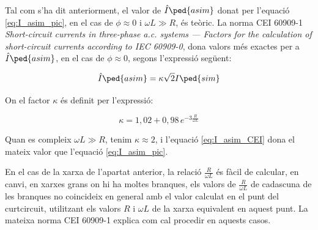 Tal com s'ha dit anteriorment, el valor de $\hat{I}\ped{asim}$ donat per l'equació \eqref{eq:I_asim_pic}, en el cas de $\phi \approx 0$ i $\omega L\gg R$, és teòric. La norma CEI 60909-1 \textit{Short-circuit currents in three-phase a.c. systems ---  Factors for the calculation of short-circuit currents according to IEC 60909-0}, dona valors més exactes per a $\hat{I}\ped{asim}$, en el cas de $\phi \approx 0$, segons l'expressió següent:

\begin{equation}
    \hat{I}\ped{asim} = \kappa \sqrt{2} I\ped{sim} \label{eq:I_asim_CEI}
\end{equation}

On el factor $\kappa$ és definit per l'expressió:

\begin{equation}
    \kappa = 1{,}02 + 0{,}98 \,e^{-3\frac{R}{\omega L}}\label{eq:kappa_CEI}
\end{equation}

Quan es compleix $\omega L\gg R$, tenim $\kappa \approx 2$, i l'equació \eqref{eq:I_asim_CEI} dona el mateix valor que l'equació \eqref{eq:I_asim_pic}.

En el cas de la xarxa de l'apartat anterior, la relació $\frac{R}{\omega L}$ és fàcil de  calcular, en canvi, en xarxes grans on hi ha moltes branques, els valors de $\frac{R}{\omega L}$ de cadascuna de les branques no coincideix en general amb el valor calculat en el punt del curtcircuit, utilitzant els valors $R$ i $\omega L$ de la xarxa equivalent en aquest punt. La mateixa norma CEI 60909-1 explica com cal procedir en aquests casos.


